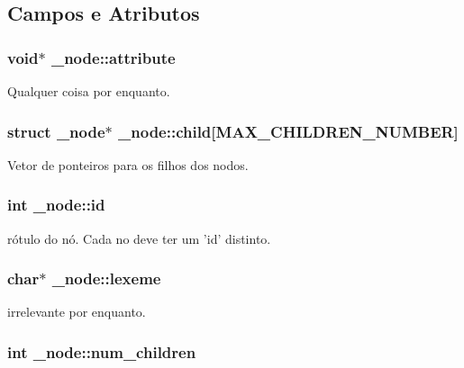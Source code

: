 \subsection{Campos e Atributos}
\hypertarget{struct__node_a8635514c1a76f9660692563ea9bb8ef1}{
\subsubsection[{attribute}]{\setlength{\rightskip}{0pt plus 5cm}void$\ast$ {\bf \_\-node::attribute}}}
\label{struct__node_a8635514c1a76f9660692563ea9bb8ef1}
Qualquer coisa por enquanto. \hypertarget{struct__node_aa1e3d575ec8721f5c4924c8b83163acc}{
\subsubsection[{child}]{\setlength{\rightskip}{0pt plus 5cm}struct {\bf \_\-node}$\ast$ {\bf \_\-node::child}\mbox{[}MAX\_\-CHILDREN\_\-NUMBER\mbox{]}}}
\label{struct__node_aa1e3d575ec8721f5c4924c8b83163acc}
Vetor de ponteiros para os filhos dos nodos. \hypertarget{struct__node_ab39ddc82d829722815b9bbd71ce4bd8d}{
\subsubsection[{id}]{\setlength{\rightskip}{0pt plus 5cm}int {\bf \_\-node::id}}}
\label{struct__node_ab39ddc82d829722815b9bbd71ce4bd8d}
rótulo do nó. Cada no deve ter um 'id' distinto. \hypertarget{struct__node_ad88ded3f26dc3e6469372e4740cefba7}{
\subsubsection[{lexeme}]{\setlength{\rightskip}{0pt plus 5cm}char$\ast$ {\bf \_\-node::lexeme}}}
\label{struct__node_ad88ded3f26dc3e6469372e4740cefba7}
irrelevante por enquanto. \hypertarget{struct__node_a5f1c09c3697d9a06e1e530441aac18bc}{
\subsubsection[{num\_\-children}]{\setlength{\rightskip}{0pt plus 5cm}int {\bf \_\-node::num\_\-children}}}
